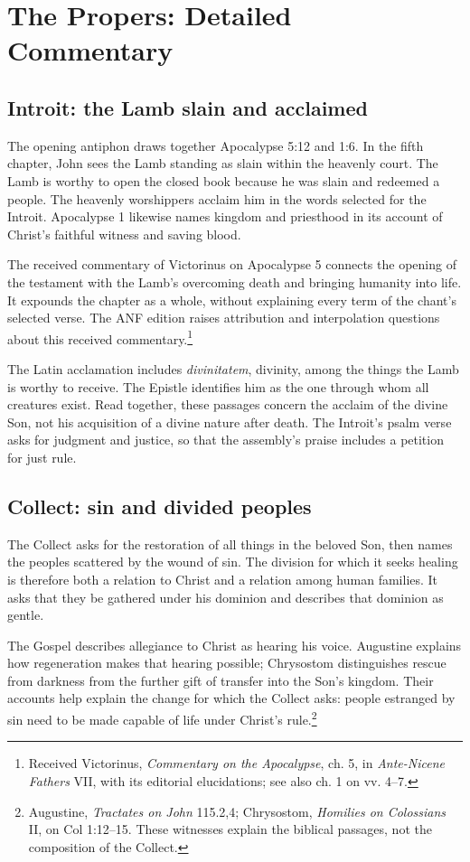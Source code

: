 \section{The Propers: Detailed Commentary}
\subsection{Introit: the Lamb slain and acclaimed}
The opening antiphon draws together Apocalypse 5:12 and 1:6. In the fifth chapter, John sees the Lamb standing as slain within the heavenly court. The Lamb is worthy to open the closed book because he was slain and redeemed a people. The heavenly worshippers acclaim him in the words selected for the Introit. Apocalypse 1 likewise names kingdom and priesthood in its account of Christ's faithful witness and saving blood.

The received commentary of Victorinus on Apocalypse 5 connects the opening of the testament with the Lamb's overcoming death and bringing humanity into life. It expounds the chapter as a whole, without explaining every term of the chant's selected verse. The ANF edition raises attribution and interpolation questions about this received commentary.\footnote{Received Victorinus, \emph{Commentary on the Apocalypse}, ch. 5, in \emph{Ante-Nicene Fathers} VII, with its editorial elucidations; see also ch. 1 on vv. 4--7.}

The Latin acclamation includes \emph{divinitatem}, divinity, among the things the Lamb is worthy to receive. The Epistle identifies him as the one through whom all creatures exist. Read together, these passages concern the acclaim of the divine Son, not his acquisition of a divine nature after death. The Introit's psalm verse asks for judgment and justice, so that the assembly's praise includes a petition for just rule.

\subsection{Collect: sin and divided peoples}
The Collect asks for the restoration of all things in the beloved Son, then names the peoples scattered by the wound of sin. The division for which it seeks healing is therefore both a relation to Christ and a relation among human families. It asks that they be gathered under his dominion and describes that dominion as gentle.

The Gospel describes allegiance to Christ as hearing his voice. Augustine explains how regeneration makes that hearing possible; Chrysostom distinguishes rescue from darkness from the further gift of transfer into the Son's kingdom. Their accounts help explain the change for which the Collect asks: people estranged by sin need to be made capable of life under Christ's rule.\footnote{Augustine, \emph{Tractates on John} 115.2,4; Chrysostom, \emph{Homilies on Colossians} II, on Col 1:12--15. These witnesses explain the biblical passages, not the composition of the Collect.}

